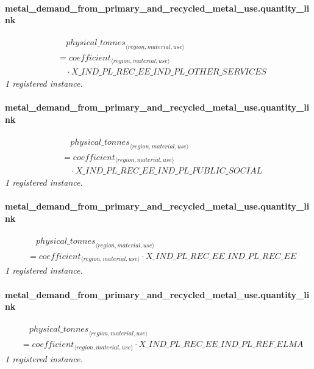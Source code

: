 \documentclass[11pt]{article}
\begin{document}
\paragraph{metal\_demand\_from\_primary\_and\_recycled\_metal\_use.quantity\_link}
\begin{align*}
&\quad {physical\_tonnes}_{\langle region, material, use\rangle}\\
&= coefficient_{\langle region, material, use\rangle}\\
&\quad {}\cdot X\_IND\_PL\_REC\_EE\_IND\_PL\_OTHER\_SERVICES
\end{align*}
\noindent\emph{1 registered instance.}\par
\paragraph{metal\_demand\_from\_primary\_and\_recycled\_metal\_use.quantity\_link}
\begin{align*}
&\quad {physical\_tonnes}_{\langle region, material, use\rangle}\\
&= coefficient_{\langle region, material, use\rangle}\\
&\quad {}\cdot X\_IND\_PL\_REC\_EE\_IND\_PL\_PUBLIC\_SOCIAL
\end{align*}
\noindent\emph{1 registered instance.}\par
\paragraph{metal\_demand\_from\_primary\_and\_recycled\_metal\_use.quantity\_link}
\begin{align*}
&\quad {physical\_tonnes}_{\langle region, material, use\rangle}\\
&= coefficient_{\langle region, material, use\rangle} \cdot X\_IND\_PL\_REC\_EE\_IND\_PL\_REC\_EE
\end{align*}
\noindent\emph{1 registered instance.}\par
\paragraph{metal\_demand\_from\_primary\_and\_recycled\_metal\_use.quantity\_link}
\begin{align*}
&\quad {physical\_tonnes}_{\langle region, material, use\rangle}\\
&= coefficient_{\langle region, material, use\rangle} \cdot X\_IND\_PL\_REC\_EE\_IND\_PL\_REF\_ELMA
\end{align*}
\noindent\emph{1 registered instance.}\par
\end{document}
